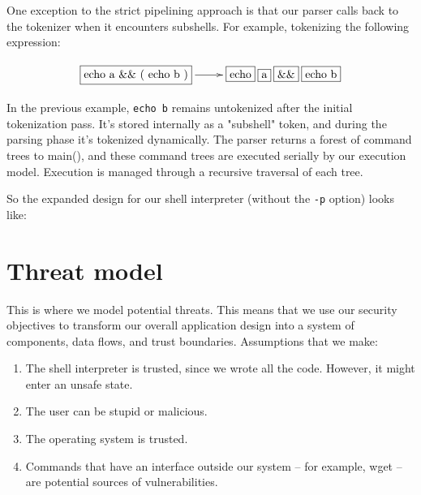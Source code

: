 \documentclass[12pt]{article}
\begin{document}
One exception to the strict pipelining approach is that our parser calls back to the tokenizer when it encounters subshells. For example, tokenizing the following expression:

\begin{displaymath}
\xymatrix{
\framebox{echo a \&\& ( echo b )} \ar[r] & \framebox{echo} \: \framebox{a} \: \framebox{\&\&} \: \framebox{echo  b}
}
\end{displaymath}

In the previous example, \texttt{echo b} remains untokenized after the initial tokenization pass. It's stored internally as a "subshell" token, and during the parsing phase it's tokenized dynamically. The parser returns a forest of command trees to main(), and these command trees are executed serially by our execution model. Execution is managed through a recursive traversal of each tree.

So the expanded design for our shell interpreter (without the \texttt{-p} option) looks like:


\section{Threat model}
This is where we model potential threats. This means that we use our security objectives to transform our overall application design into a system of components, data flows, and trust boundaries. Assumptions that we make:

\begin{enumerate}
  \item The shell interpreter is trusted, since we wrote all the code. However, it might enter an unsafe state.
  \item The user can be stupid or malicious.
  \item The operating system is trusted.
  \item Commands that have an interface outside our system -- for example, wget -- are potential sources of vulnerabilities.
\end{enumerate}
\end{document}

